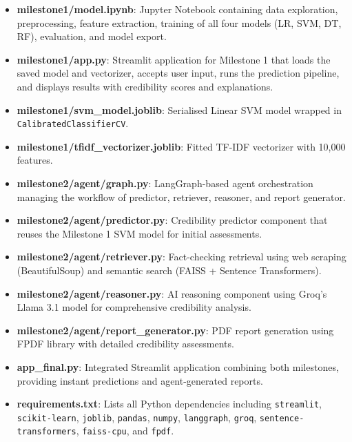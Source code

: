\documentclass[conference]{IEEEtran}
\begin{document}
\begin{itemize}
    \item \textbf{milestone1/model.ipynb}: Jupyter Notebook containing data exploration, preprocessing, feature extraction, training of all four models (LR, SVM, DT, RF), evaluation, and model export.
    \item \textbf{milestone1/app.py}: Streamlit application for Milestone 1 that loads the saved model and vectorizer, accepts user input, runs the prediction pipeline, and displays results with credibility scores and explanations.
    \item \textbf{milestone1/svm\_model.joblib}: Serialised Linear SVM model wrapped in \texttt{CalibratedClassifierCV}.
    \item \textbf{milestone1/tfidf\_vectorizer.joblib}: Fitted TF-IDF vectorizer with 10,000 features.
    \item \textbf{milestone2/agent/graph.py}: LangGraph-based agent orchestration managing the workflow of predictor, retriever, reasoner, and report generator.
    \item \textbf{milestone2/agent/predictor.py}: Credibility predictor component that reuses the Milestone 1 SVM model for initial assessments.
    \item \textbf{milestone2/agent/retriever.py}: Fact-checking retrieval using web scraping (BeautifulSoup) and semantic search (FAISS + Sentence Transformers).
    \item \textbf{milestone2/agent/reasoner.py}: AI reasoning component using Groq's Llama 3.1 model for comprehensive credibility analysis.
    \item \textbf{milestone2/agent/report\_generator.py}: PDF report generation using FPDF library with detailed credibility assessments.
    \item \textbf{app\_final.py}: Integrated Streamlit application combining both milestones, providing instant predictions and agent-generated reports.
    \item \textbf{requirements.txt}: Lists all Python dependencies including \texttt{streamlit}, \texttt{scikit-learn}, \texttt{joblib}, \texttt{pandas}, \texttt{numpy}, \texttt{langgraph}, \texttt{groq}, \texttt{sentence-transformers}, \texttt{faiss-cpu}, and \texttt{fpdf}.
\end{itemize}
\end{document}
